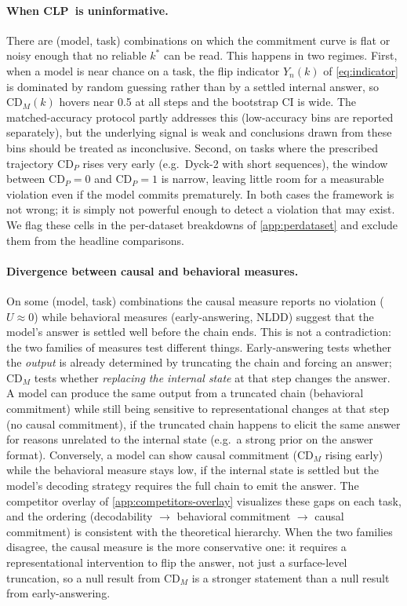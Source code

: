 \documentclass[11pt]{article}
\newcommand{\CDP}{\mathrm{CD}_{P}}
\newcommand{\CDM}{\mathrm{CD}_{M}}
\newcommand{\stepk}{k}
\newcommand{\CLP}{\textsc{CLP}}
\begin{document}
\paragraph{When \CLP\ is uninformative.}
There are (model, task) combinations on which the commitment curve is flat or
noisy enough that no reliable $\stepk^{*}$ can be read. This happens in two
regimes. First, when a model is near chance on a task, the flip indicator
$Y_{n}(\stepk)$ of \cref{eq:indicator} is dominated by random guessing rather
than by a settled internal answer, so $\CDM(\stepk)$ hovers near 0.5 at all
steps and the bootstrap CI is wide. The matched-accuracy protocol partly
addresses this (low-accuracy bins are reported separately), but the underlying
signal is weak and conclusions drawn from these bins should be treated as
inconclusive. Second, on tasks where the prescribed trajectory $\CDP$ rises
very early (e.g.\ Dyck-2 with short sequences), the window between $\CDP=0$
and $\CDP=1$ is narrow, leaving little room for a measurable violation even if
the model commits prematurely. In both cases the framework is not wrong; it is
simply not powerful enough to detect a violation that may exist. We flag these
cells in the per-dataset breakdowns of \cref{app:perdataset} and exclude them
from the headline comparisons.

\paragraph{Divergence between causal and behavioral measures.}
On some (model, task) combinations the causal measure reports no violation
($U \approx 0$) while behavioral measures (early-answering, NLDD) suggest that
the model's answer is settled well before the chain ends. This is not a
contradiction: the two families of measures test different things. Early-answering
tests whether the \emph{output} is already determined by truncating the chain
and forcing an answer; $\CDM$ tests whether \emph{replacing the internal state}
at that step changes the answer. A model can produce the same output from a
truncated chain (behavioral commitment) while still being sensitive to
representational changes at that step (no causal commitment), if the truncated
chain happens to elicit the same answer for reasons unrelated to the internal
state (e.g.\ a strong prior on the answer format). Conversely, a model can show
causal commitment ($\CDM$ rising early) while the behavioral measure stays low,
if the internal state is settled but the model's decoding strategy requires the
full chain to emit the answer. The competitor overlay of
\cref{app:competitors-overlay} visualizes these gaps on each task, and the
ordering (decodability $\to$ behavioral commitment $\to$ causal commitment) is
consistent with the theoretical hierarchy. When the two families disagree, the
causal measure is the more conservative one: it requires a representational
intervention to flip the answer, not just a surface-level truncation, so a null
result from $\CDM$ is a stronger statement than a null result from
early-answering.
\end{document}
